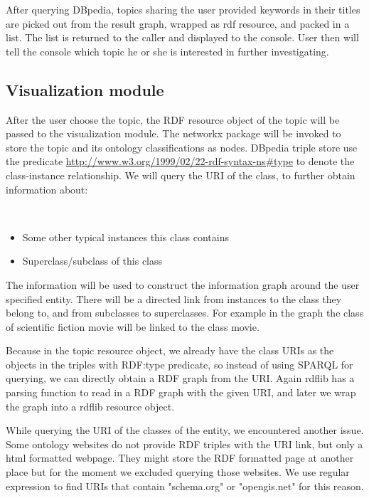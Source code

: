 \documentclass[12pt]{cls}
\begin{document}
After querying DBpedia, topics sharing the user provided keywords in their titles are picked out from the result graph, wrapped as rdf resource, and packed in a list. The list is returned to the caller and displayed to the console. User then will tell the console which topic he or she is interested in further investigating.



\subsection{Visualization module}

After the user choose the topic, the RDF resource object of the topic will be passed to the visualization module. The networkx package will be invoked to store the topic and its ontology classifications as nodes. DBpedia triple store use the predicate \url{http://www.w3.org/1999/02/22-rdf-syntax-ns#type} to denote the class-instance relationship. We will query the URI of the class, to further obtain information about:

\begin{center}
~\\
\end{center}
\begin{itemize}
\item Some other typical instances this class contains
\item Superclass/subclass of this class
\end{itemize}

The information will be used to construct the information graph around the user specified entity. There will be a directed link from instances to the class they belong to, and from subclasses to superclasses. For example in the graph the class of scientific fiction movie will be linked to the class movie.

Because in the topic resource object, we already have the class URIs as the objects in the triples with RDF:type predicate, so instead of using SPARQL for querying, we can directly obtain a RDF graph from the URI. Again rdflib has a parsing function to read in a RDF graph with the given URI, and later we wrap the graph into a rdflib resource object.

While querying the URI of the classes of the entity, we encountered another issue. Some ontology websites do not provide RDF triples with the URI link, but only a html formatted webpage. They might store the RDF formatted page at another place but for the moment we excluded querying those websites. We use regular expression to find URIs that contain "schema.org" or "opengis.net" for this reason.
\end{document}
